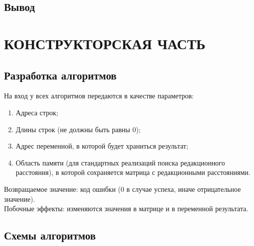 \documentclass[a4paper,12pt]{article}
\begin{document}
\subsection{Вывод}

\newpage
\section{КОНСТРУКТОРСКАЯ ЧАСТЬ}

\subsection{Разработка алгоритмов}

На вход у всех алгоритмов передаются в качестве параметров:
\begin{enumerate}
\item Адреса строк;
\item Длины строк (не должны быть равны 0);
\item Адрес переменной, в которой будет храниться результат;
\item Область памяти (для стандартных реализаций поиска редакционного расстояния), в которой сохраняется матрица с редакционными расстояниями.
\end{enumerate}
Возвращаемое значение: код ошибки (0 в случае успеха, иначе отрицательное значение). \\
Побочные эффекты: изменяются значения в матрице и в переменной результата.

\newpage
\subsection{Схемы алгоритмов}

\end{document}
